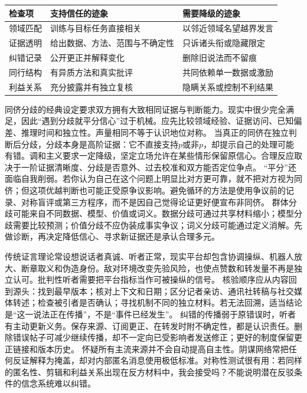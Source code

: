 \begin{center}
\begin{tabularx}{\textwidth}{@{}p{2.4cm}XX@{}}
\toprule
检查项 & 支持信任的迹象 & 需要降级的迹象 \\
\midrule
领域匹配 & 训练与目标任务直接相关 & 以邻近领域名望越界发言 \\
证据透明 & 给出数据、方法、范围与不确定性 & 只诉诸头衔或隐藏限定 \\
纠错记录 & 公开更正并解释变化 & 删除旧说法而不留痕 \\
同行结构 & 有异质方法和真实批评 & 共同依赖单一数据或激励 \\
利益关系 & 充分披露并有独立复核 & 隐瞒关系或控制不利结果 \\
\bottomrule
\end{tabularx}
\end{center}

同侪分歧的经典设定要求双方拥有大致相同证据与判断能力。现实中很少完全满足，因此“遇到分歧就平分信心”过于机械。应先比较领域经验、证据访问、已知偏差、推理时间和独立性。声量相同不等于认识地位对称。 当真正的同侪在独立判断后分歧，分歧本身是高阶证据：它不直接支持$p$或非$p$，却提示自己的处理可能有错。调和主义要求一定降级，坚定立场允许在某些情形保留原信心。合理反应取决于一阶证据清晰度、分歧是否意外、过去校准和双方能否定位争点\parencite{christensen2007,kelly2005}。 “平分”还面临自我削弱。若你认为自己在这个问题上明显比对方更可靠，就不把对方视为同侪；但这项优越判断也可能正受原争议影响。避免循环的方法是使用争议前的记录、对称盲评或第三方程序，而不是因自己觉得论证更好便宣布非同侪。 群体分歧可能来自不同数据、模型、价值或词义。数据分歧可通过共享材料缩小；模型分歧需要比较预测；价值分歧不应伪装成事实争议；词义分歧可能通过定义消解。先做诊断，再决定降低信心、寻求新证据还是承认合理多元。

传统证言理论常设想说话者真诚、听者正常，现实平台却包含协调操纵、机器人放大、断章取义和伪造身份。敌对环境改变先验风险，也使点赞数和转发量不再是独立认可。批判性听者需要把平台指标当作可被操纵的信号。 核验顺序应从内容回到源头：找到最早版本；核对上下文和日期；区分记者亲访、通讯社转稿与社交媒体转述；检查被引者是否确认；寻找机制不同的独立材料。若无法回溯，适当结论是“这一说法正在传播”，不是“事件已经发生”。 纠错的传播弱于原错误时，听者有主动更新义务。保存来源、订阅更正、在转发时附不确定性，都是认识责任。删除错误帖子可减少继续传播，却不一定向已受影响者发送修正；更好的制度保留更正链接和版本历史。 怀疑所有主流来源并不会自动提高自主性。阴谋网络常把任何反证解释为掩盖，却对内部匿名消息使用极低标准。对称性测试很有用：若同样的匿名性、剪辑和利益关系出现在反方材料中，我会接受吗？不能说明潜在反驳条件的信念系统难以纠错。

